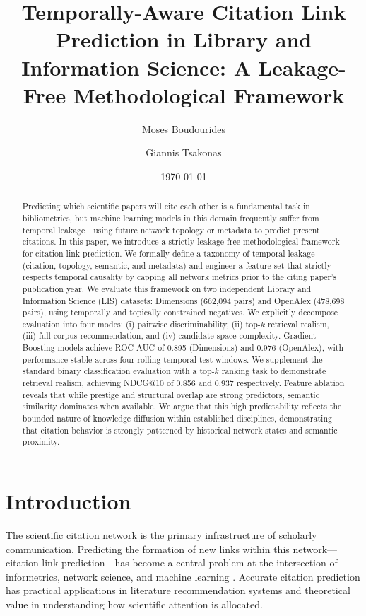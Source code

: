 \documentclass[11pt,a4paper]{article}
\title{Temporally-Aware Citation Link Prediction in Library and Information Science: A Leakage-Free Methodological Framework}
\author[1]{Moses Boudourides}
\author[2]{Giannis Tsakonas}
\affil[1]{Department of Mathematics, University of Patras, Greece}
\affil[2]{Library \& Information Center, University of Patras, Greece}
\date{\today}
\begin{document}
\maketitle

\begin{abstract}
Predicting which scientific papers will cite each other is a fundamental task in bibliometrics, but machine learning models in this domain frequently suffer from temporal leakage---using future network topology or metadata to predict present citations. In this paper, we introduce a strictly leakage-free methodological framework for citation link prediction. We formally define a taxonomy of temporal leakage (citation, topology, semantic, and metadata) and engineer a feature set that strictly respects temporal causality by capping all network metrics prior to the citing paper's publication year. We evaluate this framework on two independent Library and Information Science (LIS) datasets: Dimensions (662,094 pairs) and OpenAlex (478,698 pairs), using temporally and topically constrained negatives. We explicitly decompose evaluation into four modes: (i) pairwise discriminability, (ii) top-$k$ retrieval realism, (iii) full-corpus recommendation, and (iv) candidate-space complexity. Gradient Boosting models achieve ROC-AUC of 0.895 (Dimensions) and 0.976 (OpenAlex), with performance stable across four rolling temporal test windows. We supplement the standard binary classification evaluation with a top-$k$ ranking task to demonstrate retrieval realism, achieving NDCG@10 of 0.856 and 0.937 respectively. Feature ablation reveals that while prestige and structural overlap are strong predictors, semantic similarity dominates when available. We argue that this high predictability reflects the bounded nature of knowledge diffusion within established disciplines, demonstrating that citation behavior is strongly patterned by historical network states and semantic proximity.
\end{abstract}

\section{Introduction}
\label{sec:intro}

The scientific citation network is the primary infrastructure of scholarly communication. Predicting the formation of new links within this network---citation link prediction---has become a central problem at the intersection of informetrics, network science, and machine learning \citep{wang2013quantifying, shibata2012link}. Accurate citation prediction has practical applications in literature recommendation systems and theoretical value in understanding how scientific attention is allocated.
\end{document}

